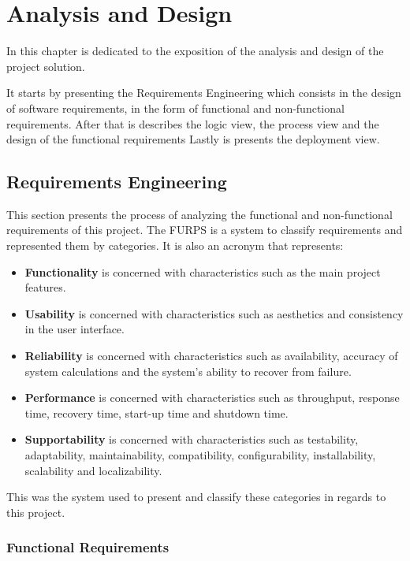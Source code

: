 
\chapter{Analysis and Design} %
\label{chap:Chapter4}

In this chapter is dedicated to the exposition of the analysis and design of the project solution.

It starts by presenting the Requirements Engineering which consists in the design of software requirements, in the form of functional and non-functional requirements.
After that is describes the logic view, the process view and the design of the functional requirements
Lastly is presents the deployment view.

\section{Requirements Engineering}

This section presents the process of analyzing the functional and non-functional requirements of this project.
The FURPS\cite{eeles2005capturing} is a system to classify requirements and represented them by categories.
It is also an acronym that represents:

\begin{itemize}
    \item \textbf{Functionality} is concerned with characteristics such as the main project features.
    \item \textbf{Usability} is concerned with characteristics such as aesthetics and consistency in the user interface.
    \item \textbf{Reliability} is concerned with characteristics such as availability, accuracy of system calculations and the system's ability to recover from failure.
    \item \textbf{Performance} is concerned with characteristics such as throughput, response time, recovery time, start-up time and shutdown time.
    \item \textbf{Supportability} is concerned with characteristics such as testability, adaptability, maintainability, compatibility, configurability, installability, scalability and localizability.
\end{itemize}

This was the system used to present and classify these categories in regards to this project.

\subsection{Functional Requirements}

